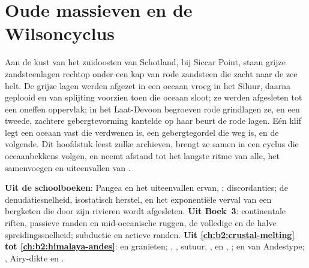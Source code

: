 \chapter{Oude massieven en de Wilsoncyclus}\label{ch:b2:wilson-cycle}

Aan de kust van het zuidoosten van Schotland, bij Siccar Point, staan grijze zandsteenlagen rechtop
onder een kap van rode zandsteen die zacht naar de zee helt. De grijze lagen werden afgezet in
een oceaan vroeg in het Siluur, daarna geplooid en van splijting voorzien toen die oceaan sloot; ze werden
afgesleten tot een oneffen oppervlak; in het Laat-Devoon begroeven rode grindlagen ze, en een tweede,
zachtere gebergtevorming kantelde op haar beurt de rode lagen. Eén klif legt een oceaan vast die
verdwenen is, een gebergtegordel die weg is, en de volgende. Dit hoofdstuk leest zulke archieven,
brengt ze samen in een cyclus die oceaanbekkens volgen, en neemt afstand tot het langste ritme van
alle, het samenvoegen en uiteenvallen van .

\begin{recall}
\textbf{Uit de schoolboeken}: Pangea en het uiteenvallen ervan, ; discordanties;
de denudatiesnelheid, isostatisch herstel, en het exponentiële verval van een bergketen die door
zijn rivieren wordt afgesleten. \textbf{Uit Boek~3}: continentale riften, passieve randen en
mid-oceanische ruggen, de volledige en de halve spreidingssnelheid; subductie en actieve randen.
\textbf{Uit \cref{ch:b2:crustal-melting} tot \cref{ch:b2:himalaya-andes}}:  en
granieten; , , sutuur, ,  en , ;  en
 van Andestype; , Airy-dikte en .
\end{recall}

